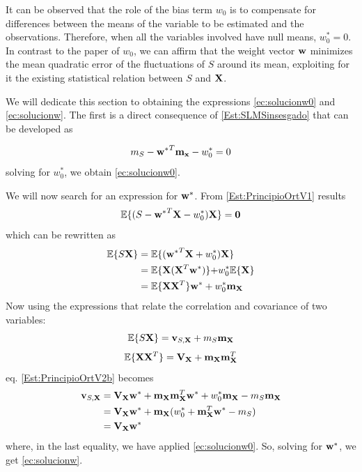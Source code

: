 It can be observed that the role of the bias term $w_0$ is to compensate for differences between the means of the variable to be estimated and the observations. Therefore, when all the variables involved have null means, $w_0^* = 0$. In contrast to the paper of $w_0$, we can affirm that the weight vector ${\bf w}$ minimizes the mean quadratic error of the fluctuations of $S$ around its mean, exploiting for it the existing statistical relation between $S$ and $\bf X$.

We will dedicate this section to obtaining the expressions \eqref{ec:solucionw0} and \eqref{ec:solucionw}. The first is a direct consequence of \eqref{Est:SLMSinsesgado} that can be developed as 

\begin{equation}
m_S - {{\bf w}^*}^T{\bf m_x} - w_0^* =0 
\end{equation}
solving for $w_0^*$, we obtain \eqref{ec:solucionw0}.

{We will now search for an expression for ${\bf w}^*$. From \eqref{Est:PrincipioOrtV1} results
\begin{equation}
\label{Est:PrincipioOrtV2}
\mathbb{E}\{(S - {{{\bf w}^*}^T} {\bf X} - w_0^*) {\bf X}\} = {\bf 0}
\end{equation}
which can be rewritten as
\begin{align}
\label{Est:PrincipioOrtV2b}
\mathbb{E}\{S {\bf X}\} 
   &= \mathbb{E}\{({{\bf w}^*}^T {\bf X} + {w_0^*}) {\bf X}\}     \nonumber\\
   &= \mathbb{E}\{{\bf X} ({{\bf X}^T{\bf w}^*}) \} {+ w_0^*} \mathbb{E}\{{\bf X} \}  \nonumber\\
   &= \mathbb{E}\{{\bf X} {\bf X}^T \}{\bf w}^* + w_0^* {\bf m_X}  
\end{align}
}
Now using the expressions that relate the correlation and covariance of two variables:
\begin{equation}
\mathbb{E}\{S {\bf X}\} = {\bf v}_{S,{\bf X}} + m_S {\bf m_X}
\end{equation}
\begin{equation}
\mathbb{E}\{{\bf X}{\bf X}^T\} = {\bf V_X} + {\bf m_X}{\bf m}_{\bf X}^T
\end{equation}
eq. \eqref{Est:PrincipioOrtV2b} becomes 
\begin{align}
\label{Est:PrincipioOrtV3}
{\bf v}_{S,{\bf X}}  
   &= {\bf V_X}{\bf w}^* + {\bf m_X}{\bf m}_{\bf X}^T{\bf w}^* + w_0^* {\bf m_X} - m_S {\bf m_X}  \nonumber\\ 
   &= {\bf V_X}{\bf w}^* 
    + {\bf m_X}(w_0^* + {\bf m}_{\bf X}^T{\bf w}^* - m_S) 
     \nonumber\\ 
   &= {\bf V_X}{\bf w}^* 
\end{align}
where, in the last equality, we have applied \eqref{ec:solucionw0}. So, solving for ${\bf w}^*$, we get \eqref{ec:solucionw}.



